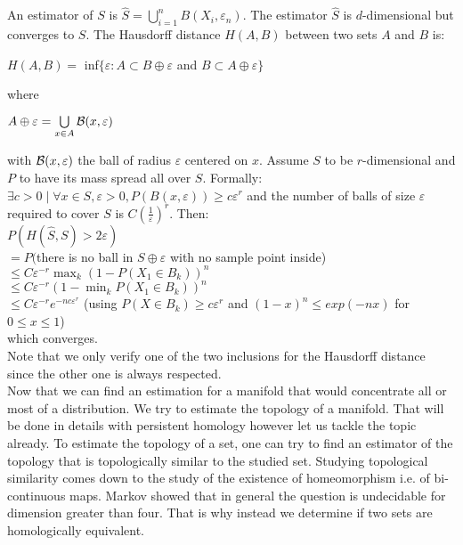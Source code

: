 \documentclass[12pt, a4paper]{article}
\begin{document}
\newpage

An estimator of $S$ is $\widehat{S} = \bigcup^n_{i=1} B(X_i, \varepsilon_n)$. The estimator $\widehat{S}$ is $d$-dimensional but converges to $S$. The Hausdorff distance $H(A,B)$ between two sets $A$ and $B$ is:

\begin{center}
  $H(A,B) =$ inf$ \lbrace \varepsilon : A \subset B \oplus \varepsilon$ and $B \subset A \oplus \varepsilon \rbrace$ 
\end{center}

where 

\begin{center}
  $A \oplus \varepsilon = \bigcup\limits_{x \in A} \mathcal{B}(x,\varepsilon)$ 
\end{center}

with $\mathcal{B}(x, \varepsilon)$ the ball of radius $\varepsilon$ centered on $x$. Assume $S$ to be $r$-dimensional and $P$ to have its mass spread all over $S$. Formally: $\exists c > 0 \mid \forall x \in S, \varepsilon > 0, P(B(x, \varepsilon)) \ge c\varepsilon^r$ and the number of balls of size $\varepsilon$ required to cover $S$ is $C(\frac{1}{\varepsilon})^r$. Then:\\

  $P(H(\widehat{S},S) > 2\varepsilon)$\\
  $= P($there is no ball in $S \oplus \varepsilon$ with no sample point inside)\\
  $\le C\varepsilon^{-r} \max_k (1-P(X_1 \in B_k))^n$\\
  $\le C\varepsilon^{-r} (1-\min_k P(X_1 \in B_k))^n$\\
  $\le C\varepsilon^{-r}e^{-nc\varepsilon^r}$ (using $P(X\in B_k) \ge c\varepsilon^r$ and $(1-x)^n \le exp(-nx)$ for $0 \le x \le 1$)
\\
which converges.\\

Note that we only verify one of the two inclusions for the Hausdorff distance since the other one is always respected.\\

Now that we can find an estimation for a manifold that would concentrate all or most of a distribution. We try to estimate the topology of a manifold. That will be done in details with persistent homology however let us tackle the topic already. To estimate the topology of a set, one can try to find an estimator of the topology that is topologically similar to the studied set. Studying topological similarity comes down to the study of the existence of homeomorphism i.e. of bi-continuous maps. Markov \cite{markov_insolubility_2001} showed that in general the question is undecidable for dimension greater than four. That is why instead we determine if two sets are homologically equivalent.\\
\end{document}
